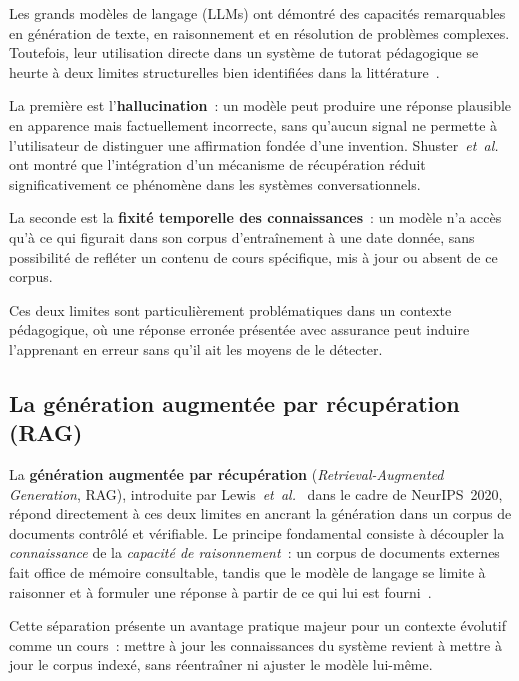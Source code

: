 \documentclass[11pt,a4paper]{article}
\begin{document}
Les grands modèles de langage (LLMs) ont démontré des capacités remarquables en génération de texte, en raisonnement et en résolution de problèmes complexes. Toutefois, leur utilisation directe dans un système de tutorat pédagogique se heurte à deux limites structurelles bien identifiées dans la littérature~\cite{gao2024ragsurvey,lewis2020rag}.

La première est l'\textbf{hallucination}~: un modèle peut produire une réponse plausible en apparence mais factuellement incorrecte, sans qu'aucun signal ne permette à l'utilisateur de distinguer une affirmation fondée d'une invention. Shuster~\textit{et~al.}~\cite{shuster2021hallucination} ont montré que l'intégration d'un mécanisme de récupération réduit significativement ce phénomène dans les systèmes conversationnels.

La seconde est la \textbf{fixité temporelle des connaissances}~: un modèle n'a accès qu'à ce qui figurait dans son corpus d'entraînement à une date donnée, sans possibilité de refléter un contenu de cours spécifique, mis à jour ou absent de ce corpus.

Ces deux limites sont particulièrement problématiques dans un contexte pédagogique, où une réponse erronée présentée avec assurance peut induire l'apprenant en erreur sans qu'il ait les moyens de le détecter.

\subsection{La génération augmentée par récupération (RAG)}

La \textbf{génération augmentée par récupération} (\textit{Retrieval-Augmented Generation}, RAG), introduite par Lewis~\textit{et~al.}~\cite{lewis2020rag} dans le cadre de NeurIPS~2020, répond directement à ces deux limites en ancrant la génération dans un corpus de documents contrôlé et vérifiable. Le principe fondamental consiste à découpler la \textit{connaissance} de la \textit{capacité de raisonnement}~: un corpus de documents externes fait office de mémoire consultable, tandis que le modèle de langage se limite à raisonner et à formuler une réponse à partir de ce qui lui est fourni~\cite{lewis2020rag}.

Cette séparation présente un avantage pratique majeur pour un contexte évolutif comme un cours~: mettre à jour les connaissances du système revient à mettre à jour le corpus indexé, sans réentraîner ni ajuster le modèle lui-même.

\end{document}

